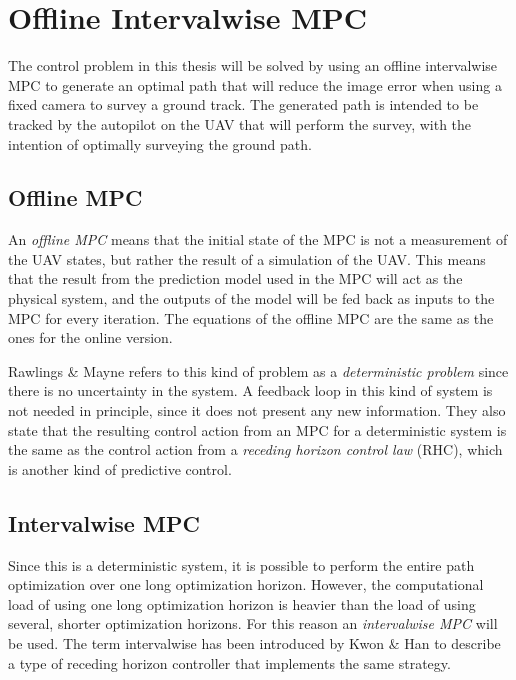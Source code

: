 \section{Offline Intervalwise MPC}
\label{sec:offline_intervalwise}

The control problem in this thesis will be solved by using an offline intervalwise MPC to generate an optimal path that will reduce the image error when using a fixed camera to survey a ground track. The generated path is intended to be tracked by the autopilot on the UAV that will perform the survey, with the intention of optimally surveying the ground path.

\subsection{Offline MPC} 

An \textit{offline MPC} means that the initial state of the MPC is not a measurement of the UAV states, but rather the result of a simulation of the UAV. This means that the result from the prediction model used in the MPC will act as the physical system, and the outputs of the model will be fed back as inputs to the MPC for every iteration. The equations of the offline MPC are the same as the ones for the online version.

Rawlings \& Mayne \cite{mpcMAYNE} refers to this kind of problem as a \textit{deterministic problem} since there is no uncertainty in the system. A feedback loop in this kind of system is not needed in principle, since it does not present any new information. They also state that the resulting control action from an MPC for a deterministic system is the same as the control action from a \textit{receding horizon control law} (RHC), which is another kind of predictive control.

\subsection{Intervalwise MPC}

Since this is a deterministic system, it is possible to perform the entire path optimization over one long optimization horizon. However, the computational load of using one long optimization horizon is heavier than the load of using several, shorter optimization horizons. For this reason an \textit{intervalwise MPC} will be used. The term intervalwise has been introduced by Kwon \& Han \cite{rhcKWON} to describe a type of receding horizon controller that implements the same strategy.

